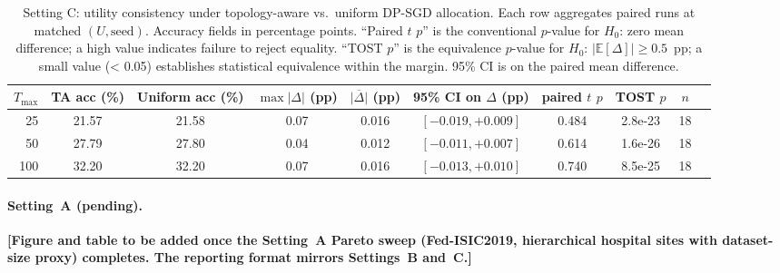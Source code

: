 \documentclass[letterpaper,journal]{IEEEtran}
\newcommand{\PLACE}[1]{\textcolor{red!75!black}{\textbf{[#1]}}}
\begin{document}
\begin{table}[t]
\centering
\caption{Setting C: utility consistency under topology-aware vs.\ uniform DP-SGD allocation. Each row aggregates paired runs at matched $(U, \text{seed})$. Accuracy fields in percentage points. ``Paired $t$ $p$'' is the conventional $p$-value for $H_0$: zero mean difference; a high value indicates failure to reject equality. ``TOST $p$'' is the equivalence $p$-value for $H_0$: $|\mathbb{E}[\Delta]|\ge 0.5$~pp; a small value (< 0.05) establishes statistical equivalence within the margin. 95\% CI is on the paired mean difference.}
\label{tab:util-consistency-c}
\begin{tabular}{@{}rccccccccc@{}}
\toprule
$T_{\max}$ & TA acc (\%) & Uniform acc (\%) & $\max|\Delta|$ (pp) & $\overline{|\Delta|}$ (pp) & 95\% CI on $\Delta$ (pp) & paired $t$ $p$ & TOST $p$ & $n$ \\
\midrule
25 & 21.57 & 21.58 & 0.07 & 0.016 & $[-0.019, +0.009]$ & 0.484 & 2.8e-23 & 18 \\
50 & 27.79 & 27.80 & 0.04 & 0.012 & $[-0.011, +0.007]$ & 0.614 & 1.6e-26 & 18 \\
100 & 32.20 & 32.20 & 0.07 & 0.016 & $[-0.013, +0.010]$ & 0.740 & 8.5e-25 & 18 \\
\bottomrule
\end{tabular}
\end{table}

\paragraph{Setting~A (pending).}
\PLACE{Figure and table to be added once the Setting~A Pareto sweep
(Fed-ISIC2019, hierarchical hospital sites with dataset-size proxy)
completes. The reporting format mirrors Settings~B and~C.}
\end{document}
